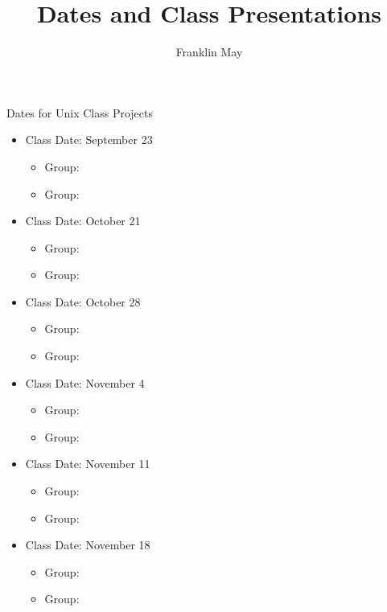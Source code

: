 \documentclass[12pt]{article}
\begin{document}
\author{Franklin May}
\title{Dates and Class Presentations}
\maketitle

Dates for Unix Class Projects
\begin{itemize}
\item Class Date: September 23
\begin{itemize}
\item Group:
\item Group:
\end{itemize}
\item Class Date: October 21
\begin{itemize}
\item Group:
\item Group:
\end{itemize}
\item Class Date: October 28
\begin{itemize}
\item Group:
\item Group:
\end{itemize}
\item Class Date: November 4
\begin{itemize}
\item Group:
\item Group:
\end{itemize}
\item Class Date: November 11
\begin{itemize}
\item Group:
\item Group:
\end{itemize}
\item Class Date: November 18
\begin{itemize}
\item Group:
\item Group:
\end{itemize}
\end{itemize}
\end{document}
